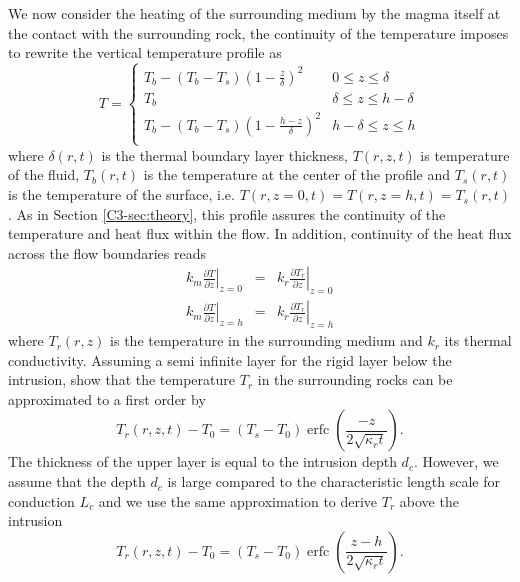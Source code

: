 We now  consider the heating  of the  surrounding medium by  the magma
itself at the contact with the surrounding rock, the continuity of the
temperature imposes to rewrite the vertical temperature profile as
\begin{equation}
  T=
  \begin{cases}
    T_b - (T_b-T_s)(1-\frac{z}{\delta})^2 & 0 \le z\le \delta \\
    T_b & \delta \le z\le h-\delta \\
    T_b - (T_b-T_s)(1-\frac{h-z}{\delta})^2 & h-\delta \le z\le h\\
  \end{cases}
  \label{C4-Temperature}
\end{equation}
where  $\delta(r,t)$   is  the   thermal  boundary   layer  thickness,
$T(r,z,t)$ is temperature of the  fluid, $T_b(r,t)$ is the temperature
at the center of the profile  and $T_s(r,t)$ is the temperature of the
surface,  i.e.    $T(r,z=0,t)=T(r,z=h,t)=T_s(r,t)$.   As   in  Section
\ref{C3-sec:theory},  this  profile  assures  the  continuity  of  the
temperature and heat flux within  the flow. In addition, continuity of
the heat flux across the flow boundaries reads
\begin{eqnarray}
  k_m\left.\frac{\partial                                    T}{\partial
  z}\right|_{z=0}&=&k_r\left.\frac{\partial              T_r}{\partial
                     z}\right|_{z=0}  \label{C4-Flux1}\\
  k_m\left.\frac{\partial                                  T}{\partial
  z}\right|_{z=h}&=&k_r\left.\frac{\partial            T_r}{\partial
                     z}\right|_{z=h}
                     \label{C4-Flux2}
\end{eqnarray}
where  $T_r(r,z)$ is  the temperature  in the  surrounding medium  and
$k_r$ its  thermal conductivity.  Assuming  a semi infinite  layer for
the rigid layer below  the intrusion, \citet{Carslaw:1959wf} show that
the temperature $T_r$ in the  surrounding rocks can be approximated to
a first order by
\begin{equation}
  T_r(r,z,t)-T_0=(T_{s}-T_0)\operatorname{erfc}{\left(\frac{-z}{2\sqrt{\kappa_r t}}\right)}.
  \label{C4-eq22}
\end{equation}
The  thickness of  the upper  layer is  equal to  the intrusion  depth
$d_c$. However,  we assume that the  depth $d_c$ is large  compared to
the characteristic  length scale for  conduction $L_c$ and we  use the
same approximation to derive $T_r$ above the intrusion
\begin{equation}
  T_r(r,z,t)-T_0=(T_{s}-T_0)\operatorname{erfc}{\left(\frac{z-h}{2\sqrt{\kappa_r t}}\right)}.
  \label{C4-eq11}
\end{equation}
